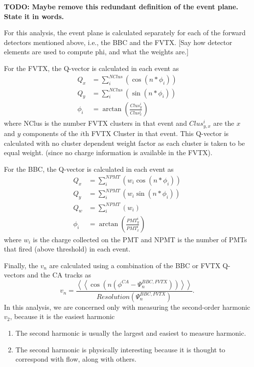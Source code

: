 \textbf{TODO: Maybe remove this redundant definition of the event plane. State it in words.}

For this analysis, the event plane is calculated separately for each of the forward detectors mentioned above, i.e., the BBC and the FVTX. [Say how detector elements are used to compute phi, and what the weights are.]


For the FVTX, the Q-vector is calculated in each event as
\begin{align}
Q_x &= \sum^{NClus}_i( \cos(n * \phi_i)) \\
Q_y &= \sum^{NClus}_i( \sin(n * \phi_i)) \\
\phi_i &= \arctan(\frac{Clus_{y}^i}{Clus_{x}^i})
\end{align}
where NClus is the number FVTX clusters in that event and $Clus_{y,x}^i$ are the $x$ and $y$ components of the $i$th FVTX Cluster in that event. This Q-vector is calculated with no cluster dependent weight factor as each cluster is taken to be equal weight.
(since no charge information is available in the FVTX). 

For the BBC, the Q-vector is calculated in each event as
\begin{align}
Q_x &= \sum^{NPMT}_i( w_i \cos(n * \phi_i)) \\
Q_y &= \sum^{NPMT}_i( w_i \sin(n * \phi_i)) \\
Q_w &= \sum^{NPMT}_i( w_i ) \\
\phi_i &= \arctan(\frac{PMT_{y}^i}{PMT_{x}^i}) 
\label{eqn:bbc_ep_eqns}
\end{align}
where $w_i$ is the charge collected on the PMT and NPMT is the number of PMTs that fired (above threshold) in each event.

Finally, the $v_n$ are calculated using a combination of the BBC or FVTX Q-vectors and the CA tracks as
\begin{equation}
v_n = \frac{\left<\left<\cos(n(\phi^{CA} - \Psi^{BBC,FVTX}_n))\right>\right>}{Resolution(\Psi^{BBC,FVTX}_n)}.
\end{equation}
In this analysis, we are concerned only with measuring the second-order harmonic $v_2$, because it is the easiest harmonic 
\begin{enumerate}
	\item{The second harmonic is usually the largest and easiest to measure harmonic.}
	\item{The second harmonic is physically interesting because it is thought to correspond with flow, along with others.}
\end{enumerate}
